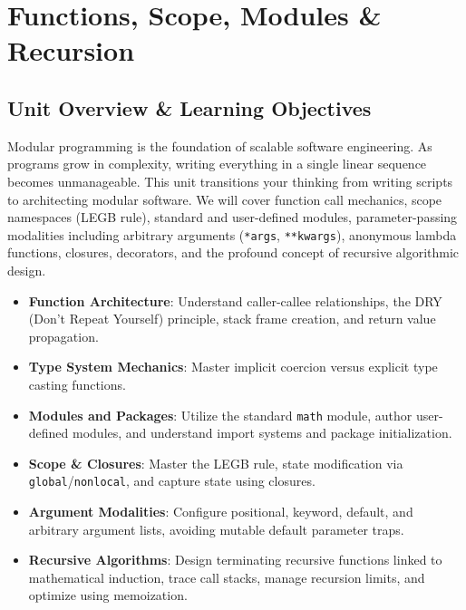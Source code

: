 \chapter{Functions, Scope, Modules \& Recursion}
\label{chap:functions-modules-recursion}

\section{Unit Overview \& Learning Objectives}

\begin{conceptbox}
Modular programming is the foundation of scalable software engineering. As programs grow in complexity, writing everything in a single linear sequence becomes unmanageable. This unit transitions your thinking from writing scripts to architecting modular software. We will cover function call mechanics, scope namespaces (LEGB rule), standard and user-defined modules, parameter-passing modalities including arbitrary arguments (\texttt{*args}, \texttt{**kwargs}), anonymous lambda functions, closures, decorators, and the profound concept of recursive algorithmic design.
\end{conceptbox}

\begin{itemize}[leftmargin=1.5em]
    \item \textbf{Function Architecture}: Understand caller-callee relationships, the DRY (Don't Repeat Yourself) principle, stack frame creation, and return value propagation.
    \item \textbf{Type System Mechanics}: Master implicit coercion versus explicit type casting functions.
    \item \textbf{Modules and Packages}: Utilize the standard \texttt{math} module, author user-defined modules, and understand import systems and package initialization.
    \item \textbf{Scope \& Closures}: Master the LEGB rule, state modification via \texttt{global}/\texttt{nonlocal}, and capture state using closures.
    \item \textbf{Argument Modalities}: Configure positional, keyword, default, and arbitrary argument lists, avoiding mutable default parameter traps.
    \item \textbf{Recursive Algorithms}: Design terminating recursive functions linked to mathematical induction, trace call stacks, manage recursion limits, and optimize using memoization.
\end{itemize}

